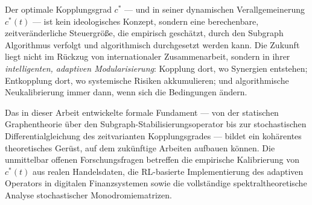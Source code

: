 ﻿\documentclass[a4paper,12pt]{article}
\theoremstyle{definition}
\begin{document}
Der optimale Kopplungsgrad $c^*$ --- und in seiner dynamischen Verallgemeinerung $c^*(t)$
--- ist kein ideologisches Konzept, sondern eine berechenbare, zeitveränderliche Steuergröße,
die empirisch geschätzt, durch den Subgraph Algorithmus verfolgt und algorithmisch
durchgesetzt werden kann. Die Zukunft liegt nicht im Rückzug von internationaler
Zusammenarbeit, sondern in ihrer \emph{intelligenten, adaptiven Modularisierung}:
Kopplung dort, wo Synergien entstehen; Entkopplung dort, wo systemische Risiken akkumulieren;
und algorithmische Neukalibrierung immer dann, wenn sich die Bedingungen ändern.

Das in dieser Arbeit entwickelte formale Fundament --- von der statischen Graphentheorie
über den Subgraph-Stabilisierungsoperator bis zur stochastischen Differentialgleichung
des zeitvarianten Kopplungsgrades --- bildet ein kohärentes theoretisches Gerüst, auf dem
zukünftige Arbeiten aufbauen können. Die unmittelbar offenen Forschungsfragen betreffen
die empirische Kalibrierung von $c^*(t)$ aus realen Handelsdaten, die RL-basierte
Implementierung des adaptiven Operators in digitalen Finanzsystemen sowie die
vollständige spektraltheoretische Analyse stochastischer Monodromiematrizen.
\end{document}

